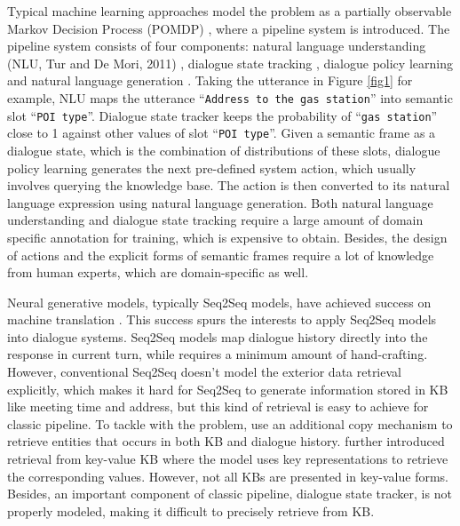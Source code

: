 \documentclass[11pt]{article}
\begin{document}
Typical machine learning approaches model the problem as a partially observable Markov Decision 
Process (POMDP) \cite{williams-young:2007:CSL,young:2013:IEEE}, where a pipeline system is 
introduced. The pipeline system consists of four components: natural language understanding (NLU, Tur and De Mori, 2011)
\nocite{tur-demori:2011}, dialogue state tracking \cite{williams:2013:SIGDial,williams:2012:NAACL}, dialogue 
policy learning \cite{young:2010:CSL} and natural language generation \cite{wen:2015:ACL}. Taking the utterance in Figure \ref{fig1} for example,
NLU maps the utterance ``\texttt{Address to the gas station}'' into semantic slot ``\texttt{POI type}''.
Dialogue state tracker keeps the probability of ``\texttt{gas station}'' close to 1
against other values of slot ``\texttt{POI type}''.
Given a semantic frame as a dialogue state, which is the combination of distributions of these slots,
dialogue policy learning generates the next pre-defined system action, which usually involves querying the knowledge base.
The action is then converted to its natural language
expression using natural language generation. Both natural language understanding and dialogue state 
tracking require a large amount of domain specific annotation for training, which is expensive to 
obtain. Besides, the design of actions and the explicit forms of semantic frames require a lot 
of knowledge from human experts, which are domain-specific as well.

Neural generative models, typically Seq2Seq models, have achieved success on machine 
translation \cite{sutskever:2014:NIPS,bahdanau-cho-bengio:2014:arxiv,luong-pham-manning:2015:EMNLP}. This success spurs the 
interests to apply Seq2Seq models into dialogue systems. Seq2Seq models
map dialogue history directly into the response in current turn,
while requires a minimum amount of hand-crafting.
However, conventional Seq2Seq doesn't model the exterior data retrieval explicitly,
which makes it hard for Seq2Seq to generate information stored in KB like meeting time and address,
but this kind of retrieval is easy to achieve for classic pipeline.
To tackle with the problem,  use an additional copy mechanism to retrieve entities that occurs in  both KB and dialogue history. 
 further introduced retrieval from key-value KB where the model uses key representations to retrieve the corresponding values.
However, not all KBs are presented in key-value forms. 
Besides, an important component of classic pipeline, dialogue state tracker,
is not properly modeled, making it difficult to precisely retrieve from KB.
\end{document}
